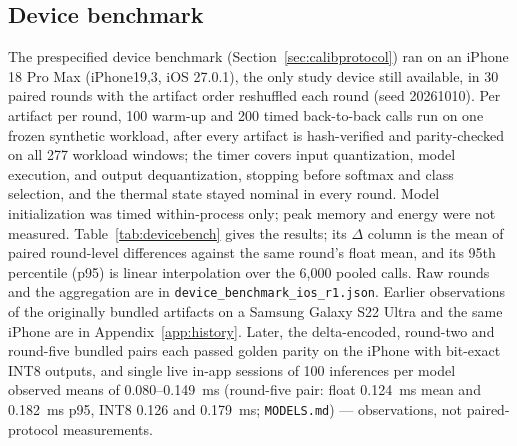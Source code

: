 \documentclass[10pt,twocolumn]{article}
\begin{document}
\subsection{Device benchmark}

The prespecified device benchmark (Section~\ref{sec:calibprotocol}) ran
on an iPhone 18 Pro Max (iPhone19,3, iOS 27.0.1), the only study device
still available, in 30 paired rounds with the artifact order reshuffled each
round (seed 20261010). Per artifact per round, 100 warm-up and 200 timed
back-to-back calls run on one frozen synthetic workload, after every
artifact is hash-verified and parity-checked on all 277 workload windows;
the timer covers input quantization, model execution, and output
dequantization, stopping before softmax and class selection, and the
thermal state stayed nominal in every round. Model initialization was
timed within-process only; peak memory and energy were not measured.
Table~\ref{tab:devicebench} gives the results; its $\Delta$ column is the
mean of paired round-level differences against the same round's float
mean, and its 95th percentile (p95) is linear interpolation over the
6{,}000 pooled calls. Raw rounds and the aggregation are in
\texttt{device\_benchmark\_ios\_r1.json}. Earlier observations of the
originally bundled artifacts on a Samsung Galaxy S22 Ultra and the same
iPhone are in Appendix~\ref{app:history}. Later, the delta-encoded,
round-two and round-five bundled pairs each passed golden parity on the
iPhone with bit-exact INT8 outputs, and single live in-app sessions of
100 inferences per model observed means of 0.080--0.149~ms (round-five
pair: float 0.124~ms mean and 0.182~ms p95, INT8 0.126 and 0.179~ms;
\texttt{MODELS.md}) --- observations, not paired-protocol measurements.
\end{document}

